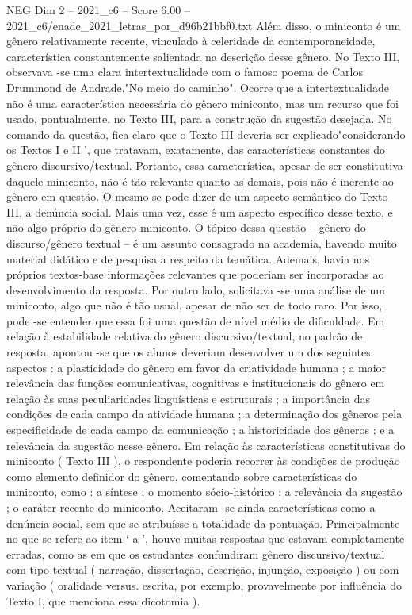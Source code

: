 \begin{textsample}{NEG Dim 2 – 2021\_c6 – Score 6.00 – 2021\_c6/enade\_2021\_letras\_por\_d96b21bbf0.txt}
Além disso, o miniconto é um gênero relativamente recente, vinculado à celeridade da contemporaneidade, característica constantemente salientada na descrição desse gênero.
No Texto III, observava -se uma clara intertextualidade com o famoso poema de Carlos Drummond de Andrade,"No meio do caminho".
Ocorre que a intertextualidade não é uma característica necessária do gênero miniconto, mas um recurso que foi usado, pontualmente, no Texto III, para a construção da sugestão desejada.
No comando da questão, fica claro que o Texto III deveria ser explicado"considerando os Textos I e II ', que tratavam, exatamente, das características constantes do gênero discursivo/textual.
Portanto, essa característica, apesar de ser constitutiva daquele miniconto, não é tão relevante quanto as demais, pois não é inerente ao gênero em questão.
O mesmo se pode dizer de um aspecto semântico do Texto III, a denúncia social.
Mais uma vez, esse é um aspecto específico desse texto, e não algo próprio do gênero miniconto.
O tópico dessa questão – gênero do discurso/gênero textual – é um assunto consagrado na academia, havendo muito material didático e de pesquisa a respeito da temática.
Ademais, havia nos próprios textos-base informações relevantes que poderiam ser incorporadas ao desenvolvimento da resposta.
Por outro lado, solicitava -se uma análise de um miniconto, algo que não é tão usual, apesar de não ser de todo raro.
Por isso, pode -se entender que essa foi uma questão de nível médio de dificuldade.
Em relação à estabilidade relativa do gênero discursivo/textual, no padrão de resposta, apontou -se que os alunos deveriam desenvolver um dos seguintes aspectos : a plasticidade do gênero em favor da criatividade humana ; a maior relevância das funções comunicativas, cognitivas e institucionais do gênero em relação às suas peculiaridades linguísticas e estruturais ; a importância das condições de cada campo da atividade humana ; a determinação dos gêneros pela especificidade de cada campo da comunicação ; a historicidade dos gêneros ; e a relevância da sugestão nesse gênero.
Em relação às características constitutivas do miniconto ( Texto III ), o respondente poderia recorrer às condições de produção como elemento definidor do gênero, comentando sobre características do miniconto, como : a síntese ; o momento sócio-histórico ; a relevância da sugestão ; o caráter recente do miniconto.
Aceitaram -se ainda características como a denúncia social, sem que se atribuísse a totalidade da pontuação.
Principalmente no que se refere ao item ‘ a ’, houve muitas respostas que estavam completamente erradas, como as em que os estudantes confundiram gênero discursivo/textual com tipo textual ( narração, dissertação, descrição, injunção, exposição ) ou com variação ( oralidade versus. escrita, por exemplo, provavelmente por influência do Texto I, que menciona essa dicotomia ).

\end{textsample}
